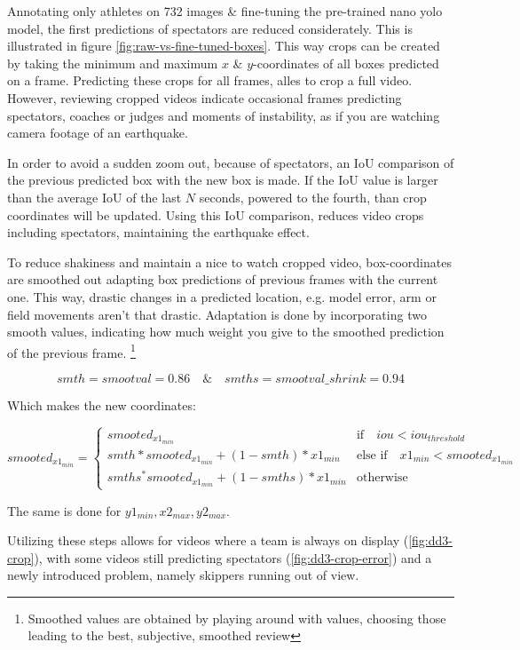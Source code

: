 Annotating only athletes on 732 images \& fine-tuning the pre-trained nano yolo model, the first predictions of spectators are reduced considerately. This is illustrated in figure \ref{fig:raw-vs-fine-tuned-boxes}.
This way crops can be created by taking the minimum and maximum \(x\) \& \(y\)-coordinates of all boxes predicted on a frame. Predicting these crops for all frames, alles to crop a full video.
However, reviewing cropped videos indicate occasional frames predicting spectators, coaches or judges and moments of instability, as if you are watching camera footage of an earthquake.

In order to avoid a sudden zoom out, because of spectators, an IoU comparison of the previous predicted box with the new box is made. If the IoU value is larger than the average IoU of the last \(N\) seconds, powered to the fourth, than crop coordinates will be updated. Using this IoU comparison, reduces video crops including spectators, maintaining the earthquake effect.


To reduce shakiness and maintain a nice to watch cropped video, box-coordinates are smoothed out adapting box predictions of previous frames with the current one. This way, drastic changes in a predicted location, e.g. model error, arm or field movements aren't that drastic. Adaptation is done by incorporating two smooth values, indicating how much weight you give to the smoothed prediction of the previous frame. \footnote{Smoothed values are obtained by playing around with values, choosing those leading to the best, subjective, smoothed review}

$$ smth = smootval = 0.86  \quad \& \quad smths = smootval\_shrink = 0.94 $$

Which makes the new coordinates:

\bigskip
\begin{math}
   smooted_{x1_{min}} =
   \begin{cases}
       smooted_{x1_{min}} & \text{if} \quad iou < iou_{threshold} \\
       smth * smooted_{x1_{min}} + (1-smth) * x1_{min} & \text{else if} \quad x1_{min} < smooted_{x1_{min}} \\
       smths^ * smooted_{x1_{min}} + (1-smths) * x1_{min} & \text{otherwise}
   \end{cases}
\end{math}
\medskip

The same is done for \( y1_{min}, x2_{max}, y2_{max} \).

Utilizing these steps allows for videos where a team is always on display (\ref{fig:dd3-crop}), with some videos still predicting spectators (\ref{fig:dd3-crop-error}) and a newly introduced problem, namely skippers running out of view.

